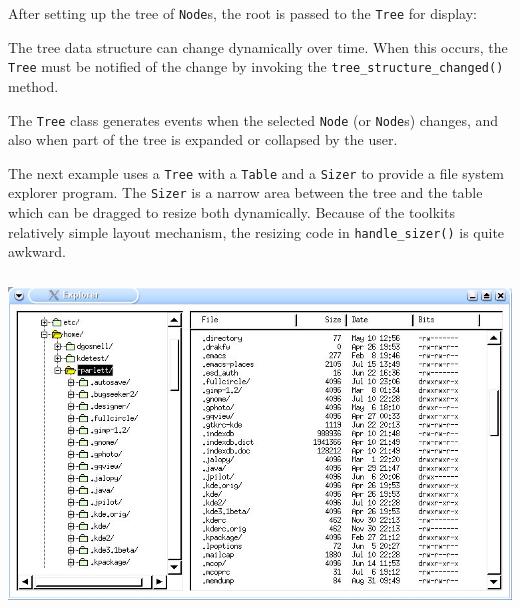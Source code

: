 
After setting up the tree of \texttt{Node}s, the root is passed
to the \texttt{Tree} for display:


\noindent The tree data structure can change dynamically over time. When this
occurs, the \texttt{Tree} must be notified of the change by invoking
the \texttt{tree\_structure\_changed()} method.

The \texttt{Tree} class generates events when the selected \texttt{Node}
(or \texttt{Node}s) changes, and also when part of the tree is expanded
or collapsed by the user.

The next example uses a \texttt{Tree} with a \texttt{Table} and a
\texttt{Sizer} to provide a file system explorer program.
The \texttt{Sizer} is a narrow area between
the tree and the table which can be dragged to resize both dynamically.
Because of the toolkit{\textquotesingle}s relatively simple layout
mechanism, the resizing code in \texttt{handle\_sizer()} is quite
awkward.



\begin{center}
\includegraphics[width=5.8134in,height=3.4898in]{ub-img/ub-img54.jpg}
\end{center}

